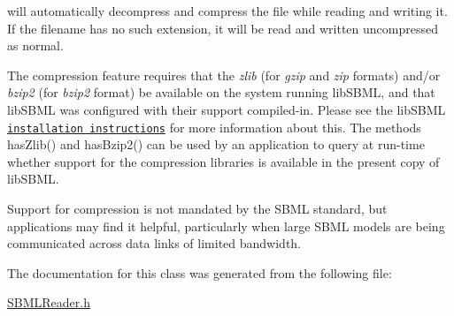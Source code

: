 will automatically decompress and compress the file while reading and writing it. If the filename has no such extension, it will be read and written uncompressed as normal.

The compression feature requires that the {\itshape zlib} (for {\itshape gzip} and {\itshape zip} formats) and/or {\itshape bzip2} (for {\itshape bzip2} format) be available on the system running lib\+S\+B\+ML, and that lib\+S\+B\+ML was configured with their support compiled-\/in. Please see the lib\+S\+B\+ML \href{libsbml-installation.html}{\tt installation instructions} for more information about this. The methods has\+Zlib() and has\+Bzip2() can be used by an application to query at run-\/time whether support for the compression libraries is available in the present copy of lib\+S\+B\+ML.

Support for compression is not mandated by the S\+B\+ML standard, but applications may find it helpful, particularly when large S\+B\+ML models are being communicated across data links of limited bandwidth. 

The documentation for this class was generated from the following file\+:\begin{DoxyCompactItemize}
\item 
\hyperlink{_s_b_m_l_reader_8h}{S\+B\+M\+L\+Reader.\+h}\end{DoxyCompactItemize}
